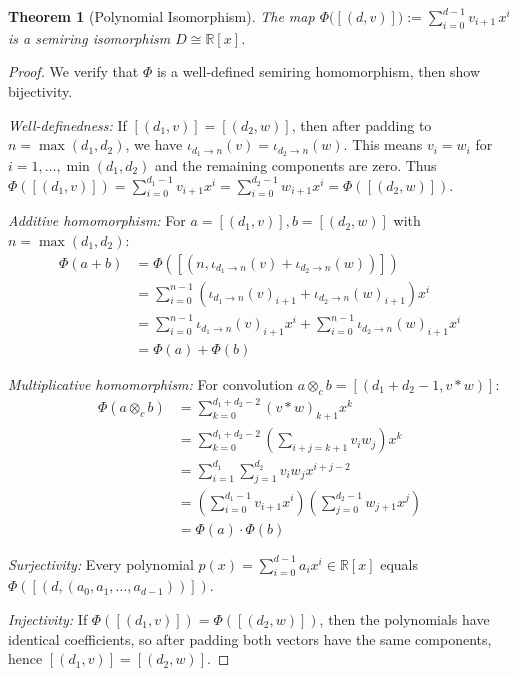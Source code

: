 \documentclass[11pt]{article}
\newtheorem{theorem}{Theorem}[section]
\begin{document}
\begin{theorem}[Polynomial Isomorphism]\label{thm:polyIso}
The map
\(\Phi\bigl([(d,v)]\bigr):=\sum_{i=0}^{d-1} v_{i+1}\,x^{i}\) is a semiring isomorphism \(D\cong\mathbb R[x]\).
\end{theorem}
\begin{proof}
We verify that $\Phi$ is a well-defined semiring homomorphism, then show bijectivity.

\textit{Well-definedness:} If $[(d_1,v)] = [(d_2,w)]$, then after padding to $n = \max(d_1,d_2)$, we have $\iota_{d_1 \to n}(v) = \iota_{d_2 \to n}(w)$. This means $v_i = w_i$ for $i = 1,\ldots,\min(d_1,d_2)$ and the remaining components are zero. Thus $\Phi([(d_1,v)]) = \sum_{i=0}^{d_1-1} v_{i+1} x^i = \sum_{i=0}^{d_2-1} w_{i+1} x^i = \Phi([(d_2,w)])$.

\textit{Additive homomorphism:} For $a = [(d_1,v)], b = [(d_2,w)]$ with $n = \max(d_1,d_2)$:
\begin{align}
\Phi(a + b) &= \Phi([(n, \iota_{d_1 \to n}(v) + \iota_{d_2 \to n}(w))]) \\
&= \sum_{i=0}^{n-1} (\iota_{d_1 \to n}(v)_{i+1} + \iota_{d_2 \to n}(w)_{i+1}) x^i \\
&= \sum_{i=0}^{n-1} \iota_{d_1 \to n}(v)_{i+1} x^i + \sum_{i=0}^{n-1} \iota_{d_2 \to n}(w)_{i+1} x^i \\
&= \Phi(a) + \Phi(b)
\end{align}

\textit{Multiplicative homomorphism:} For convolution $a \otimes_c b = [(d_1+d_2-1, v \ast w)] $:
\begin{align}
\Phi(a \otimes_c b) &= \sum_{k=0}^{d_1+d_2-2} (v \ast w)_{k+1} x^k \\
&= \sum_{k=0}^{d_1+d_2-2} \left(\sum_{i+j=k+1} v_i w_j\right) x^k \\
&= \sum_{i=1}^{d_1} \sum_{j=1}^{d_2} v_i w_j x^{i+j-2} \\
&= \left(\sum_{i=0}^{d_1-1} v_{i+1} x^i\right)\left(\sum_{j=0}^{d_2-1} w_{j+1} x^j\right) \\
&= \Phi(a) \cdot \Phi(b)
\end{align}

\textit{Surjectivity:} Every polynomial $p(x) = \sum_{i=0}^{d-1} a_i x^i \in \mathbb{R}[x]$ equals $\Phi([(d, (a_0, a_1, \ldots, a_{d-1}))])$.

\textit{Injectivity:} If $\Phi([(d_1,v)]) = \Phi([(d_2,w)])$, then the polynomials have identical coefficients, so after padding both vectors have the same components, hence $[(d_1,v)] = [(d_2,w)]$.
\end{proof}
\end{document}
